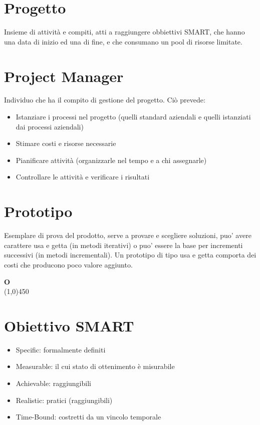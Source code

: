 \documentclass[11pt]{article}
\begin{document}
	\section{\LARGE Progetto}
	\label{sec:progetto}
	Insieme di attività e compiti, atti a raggiungere obbiettivi SMART, che hanno una data di inizio ed una di fine, e che consumano un pool di risorse limitate.	
	
	\section{\LARGE Project Manager}
	\label{sec:projectmanager}
	Individuo che ha il compito di gestione del progetto. Ciò prevede:
	\begin{itemize}  
	\item Istanziare i processi nel progetto (quelli standard aziendali e quelli istanziati dai processi aziendali)
	\item Stimare costi e risorse necessarie
	\item Pianificare attività (organizzarle nel tempo e a chi assegnarle)
	\item Controllare le attività e verificare i risultati
	\end{itemize}	
		
	\section{\LARGE Prototipo}
	\label{sec:prototipo}
	Esemplare di prova del prodotto, serve a provare e scegliere soluzioni, puo' avere carattere usa e getta (in metodi iterativi) 
	o puo' essere la base per incrementi successivi (in metodi incrementali).
	Un prototipo di tipo usa e getta comporta dei costi che producono poco valore aggiunto.\newpage	

	{\Huge{\textbf{O}}} \\
	\line(1,0){450}
		
	\section{\LARGE Obiettivo SMART}
	\label{sec:smart}
	\begin{itemize}  
	\item Specific: formalmente definiti
	\item Measurable: il cui stato di ottenimento è misurabile
	\item Achievable: raggiungibili
	\item Realistic: pratici (raggiungibili)
	\item Time-Bound: costretti da un vincolo temporale
	\end{itemize}\newpage
\end{document}
